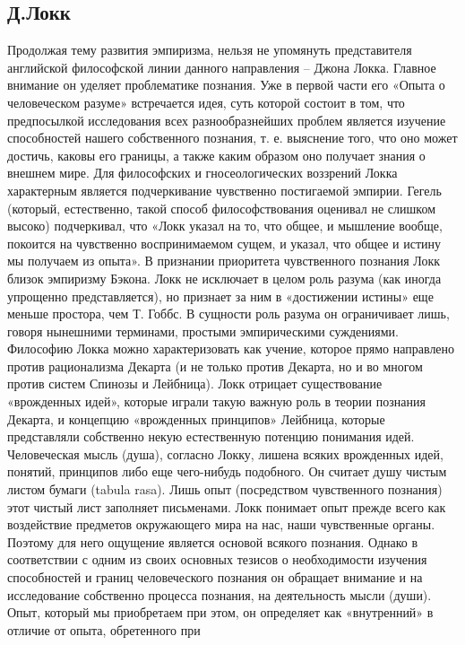 \documentclass[12pt]{article}
\begin{document}
\subsection{Д.Локк}
Продолжая  тему  развития  эмпиризма,  нельзя  не  упомянуть  представителя  английской  философской  линии
данного направления – Джона Локка. Главное внимание он уделяет проблематике познания. Уже в первой части
его  «Опыта  о  человеческом  разуме»  встречается  идея,  суть  которой  состоит  в  том,  что  предпосылкой
исследования всех разнообразнейших проблем является изучение способностей нашего собственного познания,
т. е. выяснение того, что оно может достичь, каковы его границы, а также каким образом оно получает знания о
внешнем мире.
Для  философских  и  гносеологических  воззрений  Локка  характерным  является  подчеркивание  чувственно
постигаемой эмпирии. Гегель (который, естественно, такой способ философствования оценивал не слишком
высоко)  подчеркивал,  что  «Локк  указал  на  то,  что  общее,  и  мышление  вообще,  покоится  на  чувственно
воспринимаемом сущем,  и  указал, что общее  и  истину  мы  получаем  из опыта».  В  признании приоритета
чувственного познания Локк близок эмпиризму Бэкона.
Локк  не  исключает  в  целом  роль  разума  (как  иногда  упрощенно  представляется),  но  признает  за  ним  в
«достижении истины» еще меньше простора, чем Т. Гоббс. В сущности роль разума он ограничивает лишь,
говоря нынешними терминами, простыми эмпирическими суждениями.
Философию Локка можно характеризовать как учение, которое прямо направлено против рационализма Декарта
(и  не  только  против  Декарта,  но  и  во  многом  против  систем  Спинозы  и  Лейбница).  Локк  отрицает
существование «врожденных идей», которые играли такую важную роль в теории познания Декарта, и концепцию
«врожденных принципов» Лейбница, которые представляли собственно некую естественную потенцию
понимания идей.
Человеческая мысль (душа), согласно Локку, лишена всяких врожденных идей, понятий, принципов либо еще
чего-нибудь  подобного.  Он  считает  душу  чистым  листом  бумаги  (tabula  rasa).  Лишь  опыт  (посредством
чувственного познания) этот чистый лист заполняет письменами.
Локк понимает опыт прежде всего как воздействие предметов окружающего мира на нас, наши чувственные 
органы. Поэтому для него ощущение является основой всякого познания. Однако в соответствии с одним из
своих  основных  тезисов  о  необходимости  изучения  способностей  и  границ  человеческого  познания  он
обращает внимание и на исследование собственно процесса познания, на деятельность мысли (души). Опыт,
который мы приобретаем при этом, он определяет как «внутренний» в отличие от опыта, обретенного при
\end{document}
